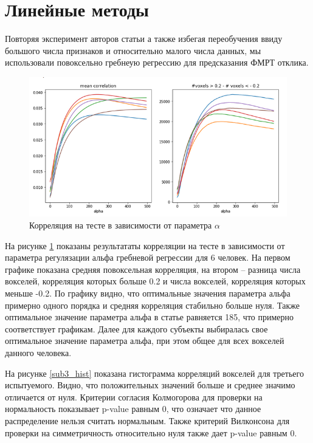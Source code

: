 \documentclass[pdftex,ptm,12pt,a4paper]{report}
\theoremstyle{definition}
\begin{document}
\section{Линейные методы}

Повторяя эксперимент авторов статьи \citep{huth2016natural} а также избегая переобучения ввиду большого числа признаков и относительно малого числа данных, мы использовали повоксельно гребнеую регрессию для предсказания ФМРТ отклика.

\begin{figure}[h]
\includegraphics[scale=0.7]{graphics/correlations2.png}
\centering
\caption{Корреляция на тесте в зависимости от параметра $\alpha$ }
\label{corr_many}
\end{figure}

На рисунке \ref{corr_many} показаны результататы корреляции на тесте в зависимости от параметра регулязации альфа гребневой регрессии для 6 человек. На первом графике показана средняя повоксельная корреляция, на втором -- разница числа вокселей, корреляция которых больше 0.2 и числа вокселей, корреляция которых меньше -0.2. По графику видно, что оптимальные значения параметра альфа примерно одного порядка и средняя корреляция стабильно больше нуля. Также оптимальное значение параметра альфа в статье \cite{huth2016natural} равняется 185, что примерно соответствует графикам. Далее для каждого субъекты выбиралась свое оптимальное значение параметра альфа, при этом общее для всех вокселей данного человека.

На рисунке \ref{sub3_hist} показана гистограмма корреляций вокселей для третьего испытуемого. Видно, что положительных значений больше и среднее значимо отличается от нуля. 
Критерии согласия Колмогорова для проверки на нормальность показывает p-value равным 0, что означает что данное распределение нельзя считать нормальным. Также критерий Вилконсона для проверки на симметричность относительно нуля также дает p-value равным 0.
\end{document}
